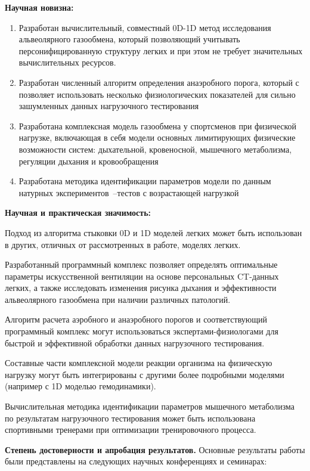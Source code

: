 \textbf{Научная новизна:}
\begin{enumerate}
\item 
 Разработан вычислительный, совместный 0D-1D метод исследования альвеолярного газообмена, который позволяющий учитывать персонифицированную структуру легких и при этом не требует значительных вычислительных ресурсов.
 \item 
 Разработан численный алгоритм определения анаэробного порога, который с позволяет использовать несколько физиологических показателей для сильно зашумленных данных нагрузочного тестирования
 \item
 Разработана комплексная модель газообмена у спортсменов при физической нагрузке, включающая в себя модели основных лимитирующих физические возможности систем: дыхательной, кровеносной, мышечного метаболизма, регуляции дыхания и кровообращения
 \item
 Разработана методика идентификации параметров модели по данным натурных экспериментов~--тестов с возрастающей нагрузкой
  
\end{enumerate}

\textbf{Научная и практическая значимость:} 

Подход из алгоритма стыковки 0D и 1D моделей легких может быть использован в  других, отличных от рассмотренных в работе, моделях легких.

Разработанный программный комплекс позволяет определять оптимальные параметры искусственной вентиляции на основе персональных CT-данных легких, а также исследовать изменения рисунка дыхания и эффективности альвеолярного газообмена при наличии различных патологий. 

Алгоритм расчета аэробного и анаэробного порогов и соответствующий программный комплекс могут использоваться экспертами-физиологами для быстрой и эффективной обработки данных нагрузочного тестирования.

Составные части комплексной модели реакции организма на физическую нагрузку могут быть интегрированы с другими более подробными моделями (например с 1D моделью гемодинамики).

Вычислительная методика идентификации параметров мышечного метаболизма по результатам нагрузочного тестирования может быть использована спортивными тренерами при оптимизации тренировочного процесса.

\textbf{Степень достоверности и апробация результатов.} 
Основные результаты работы были представлены на следующих научных конференциях и семинарах:

